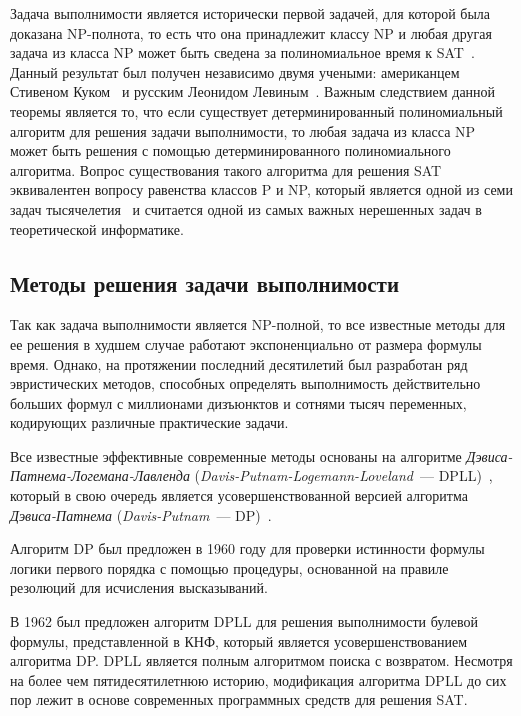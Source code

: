Задача выполнимости является исторически первой задачей, для которой была доказана NP-полнота, то есть что она принадлежит классу NP и любая другая задача из класса NP может быть сведена за полиномиальное время к SAT~\cite{reduce-ladner-75}.
Данный результат был получен независимо двумя учеными: американцем Стивеном Куком~\cite{cook-satnp-71} и русским Леонидом Левиным~\cite{levin-satnp-73}.
Важным следствием данной теоремы является то, что если существует детерминированный полиномиальный алгоритм для решения задачи выполнимости, то любая задача из класса NP может быть решения с помощью детерминированного полиномиального алгоритма.
Вопрос существования такого алгоритма для решения SAT эквивалентен вопросу равенства классов P и NP, который является одной из семи задач тысячелетия~\cite{millennium-problems-carlson-06} и считается одной из самых важных нерешенных задач в теоретической информатике.


\subsection{Методы решения задачи выполнимости}
\label{sec:review:sat:methods}


Так как задача выполнимости является NP-полной, то все известные методы для ее решения в худшем случае работают экспоненциально от размера формулы время.
Однако, на протяжении последний десятилетий был разработан ряд эвристических методов, способных определять выполнимость действительно больших формул с миллионами дизъюнктов и сотнями тысяч переменных, кодирующих различные практические задачи.

Все известные эффективные современные методы основаны на алгоритме \emph{Дэвиса-Патнема-Логемана-Лавленда} (\emph{Davis-Putnam-Logemann-Loveland}~--- DPLL)~\cite{DBLP:journals/cacm/DavisLL62}, который в свою очередь является усовершенствованной версией алгоритма \emph{Дэвиса-Патнема} (\emph{Davis-Putnam}~--- DP)~\cite{DBLP:journals/jacm/DavisP60}.

Алгоритм DP был предложен в 1960 году для проверки истинности формулы логики первого порядка с помощью процедуры, основанной на правиле резолюций для исчисления высказываний.

В 1962 был предложен алгоритм DPLL для решения выполнимости булевой формулы, представленной в КНФ, который является усовершенствованием алгоритма DP.
DPLL является полным алгоритмом поиска с возвратом. 
Несмотря на более чем пятидесятилетнюю историю, модификация алгоритма DPLL до сих пор лежит в основе современных программных средств для решения SAT.

